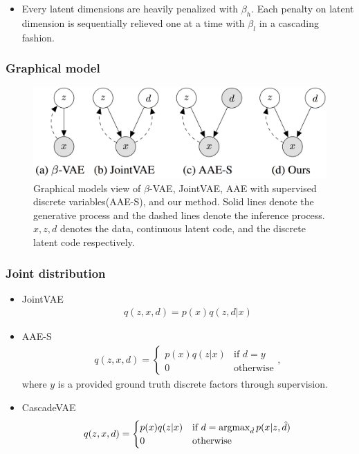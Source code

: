 \documentclass[10pt,mathserif]{beamer}
\begin{document}
\begin{frame}
\begin{figure}
\end{figure}
\begin{itemize}
\item Every latent dimensions are heavily penalized with $\beta_h$. Each penalty on latent dimension is sequentially relieved one at a time with $\beta_l$ in a cascading fashion.
\end{itemize}
\end{frame} 

\begin{frame}
\frametitle{Graphical model}
\begin{figure}[bp]
\centering
\includegraphics[width=1.0\linewidth]{dis_asset/graphical_model.png}
\caption{Graphical models view of $\beta$-VAE, JointVAE, AAE with supervised discrete variables(AAE-S), and our method. Solid lines denote the generative process and the dashed lines denote the inference process. $x,z,d$ denotes the data, continuous latent code, and the discrete latent code respectively.}
\end{figure}
\end{frame} 

\begin{frame}
\frametitle{Joint distribution}
\begin{itemize}
\item JointVAE
\begin{align}
    q(z,x,d) = p(x)q(z,d|x)\nonumber
\end{align}
\item AAE-S
\begin{align}
    q(z,x,d) = \begin{cases}p(x)q(z|x) & \text{if $d=y$} \\ 0 & \text{otherwise}\end{cases},\nonumber
\end{align}where $y$ is a provided ground truth discrete factors through supervision.
\item CascadeVAE
\begin{align}
    q(z,x,d) = \begin{cases}p(x)q(z|x) & \text{if $d = \mathop{\rm argmax}_{\hat{d}} p(x|z,\hat{d})$} \\0 &\text{otherwise}\end{cases}\nonumber
\end{align}
\end{itemize}
\end{frame}
\end{document}
